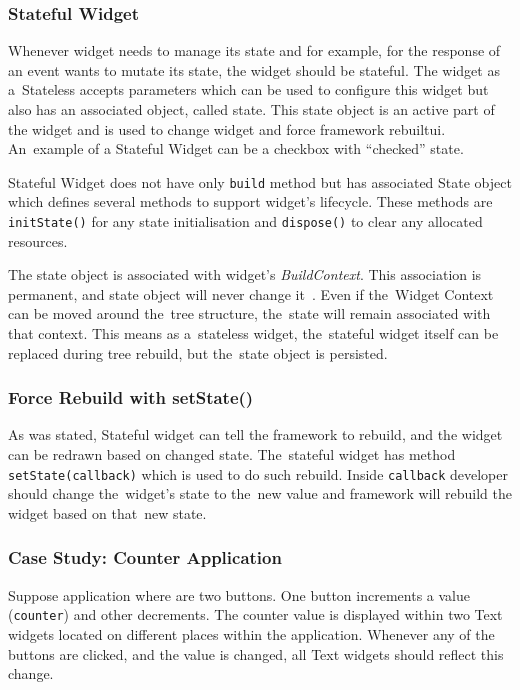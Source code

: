 \subsubsection{Stateful Widget}
Whenever widget needs to manage its state and for example, for the response of an event wants to mutate its state, the widget should be stateful.  The widget as a~Stateless accepts parameters which can be used to configure this widget but also has an associated object, called state. This state object is an active part of the widget and is used to change widget and force framework rebuilt\gls{ui}.  An~example of a Stateful Widget can be a checkbox with ``checked'' state. 

Stateful Widget does not have only \verb|build| method but has associated State object which defines several methods to support widget's lifecycle. These methods are \verb|initState()| for any state initialisation and \verb|dispose()| to clear any allocated resources. 

The state object is associated with widget's \textit{BuildContext}. This association is permanent, and state object will never change it~\cite{notion-widget-didier}. Even if the~Widget Context can be moved around the~tree structure, the~state will remain associated with that context. This means as a~stateless widget, the~stateful widget itself can be replaced during tree rebuild, but the~state object is persisted. 
\subsubsection{Force Rebuild with setState()}
As was stated, Stateful widget can tell the framework to rebuild, and the widget can be redrawn based on changed state. The~stateful widget has method \verb|setState(callback)| which is used to do such rebuild. Inside \verb|callback| developer should change the~widget's state to the~new value and framework will rebuild the widget based on that~new state. 

\subsubsection{Case Study: Counter Application}
Suppose application where are two buttons. One button increments a value (\verb|counter|) and other decrements. The counter value is displayed within two Text widgets located on different places within the application. Whenever any of the buttons are clicked, and the value is changed, all Text widgets should reflect this change.


